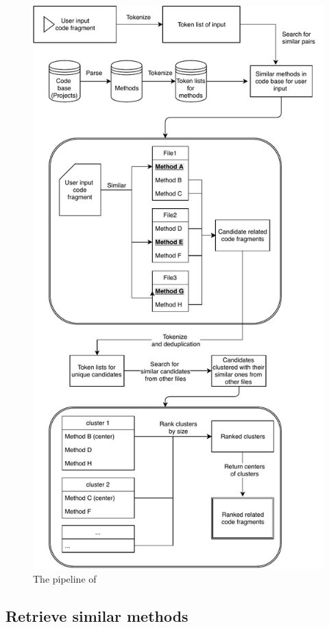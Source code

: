 \begin{figure}
	\includegraphics[width=\linewidth]{figures/pipeline.pdf}
	\caption{The pipeline of {\tool}}
	\label{fig:pipeline}
\end{figure}

\subsection{Retrieve similar methods}
